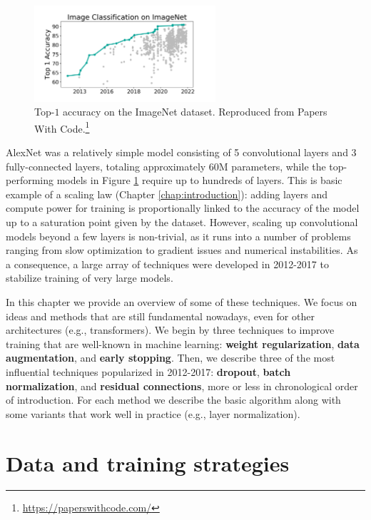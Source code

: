 \begin{figure}
    \centering
    \includegraphics[width=0.6\textwidth]{images/imagenet}
    \caption[Reproduced from Papers With Code.]{Top-$1$ accuracy on the ImageNet dataset. Reproduced from Papers With Code.\footnote{\url{https://paperswithcode.com/}}}
    \label{fig:papers_with_code}
\end{figure}

AlexNet was a relatively simple model consisting of 5 convolutional layers and 3 fully-connected layers, totaling approximately 60M parameters, while the top-performing models in Figure \ref{fig:papers_with_code} require up to hundreds of layers. This is basic example of a scaling law (Chapter \ref{chap:introduction}): adding layers and compute power for training is proportionally linked to the accuracy of the model up to a saturation point given by the dataset. However, scaling up convolutional models beyond a few layers is non-trivial, as it runs into a number of problems ranging from slow optimization to gradient issues and numerical instabilities. As a consequence, a large array of techniques were developed in 2012-2017 to stabilize training of very large models.

In this chapter we provide an overview of some of these techniques. We focus on ideas and methods that are still fundamental nowadays, even for other architectures (e.g., transformers). We begin by three techniques to improve training that are well-known in machine learning: \textbf{weight regularization}, \textbf{data augmentation}, and \textbf{early stopping}. Then, we describe three of the most influential techniques popularized in 2012-2017: \textbf{dropout}, \textbf{batch normalization}, and \textbf{residual connections}, more or less in chronological order of introduction. For each method we describe the basic algorithm along with some variants that work well in practice (e.g., layer normalization).


\section{Data and training strategies}

